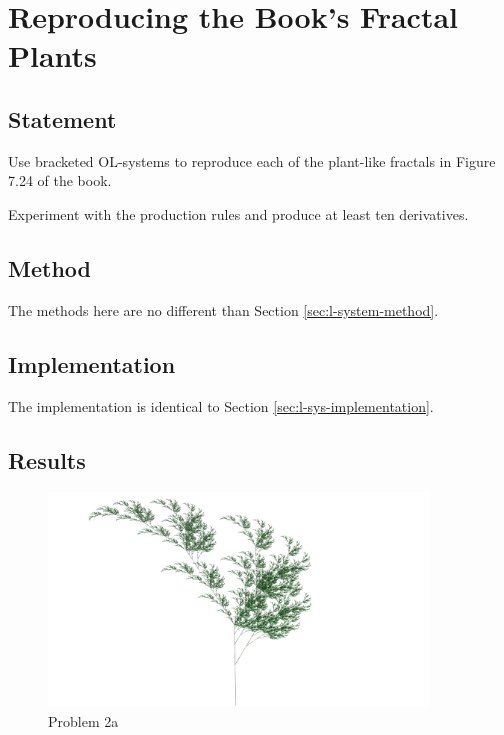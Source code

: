 \section{Reproducing the Book's Fractal Plants}

\subsection{Statement}
Use bracketed OL-systems to reproduce each of the plant-like fractals in Figure 7.24 of the book.

Experiment with the production rules and produce at least ten derivatives.

\subsection{Method}
The methods here are no different than Section \ref{sec:l-system-method}.

\subsection{Implementation}
The implementation is identical to Section \ref{sec:l-sys-implementation}.

\subsection{Results}\label{sec:p2-results}

\begin{figure}[H]
    \centering
    \includegraphics[width=0.90\textwidth]{figures/L-systems/a.png}
    \caption{Problem 2a}\label{fig:prob2a}
\end{figure}

